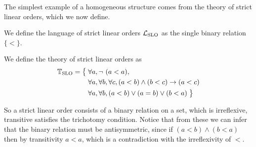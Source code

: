 The simplest example of a homogeneous structure comes from the theory of strict linear orders, which
we now define.

\begin{defn}
  We define the language of strict linear orders $\mathcal{L}_\text{SLO}$ as the single binary relation $\{ < \}$.
\end{defn}

\begin{defn}
  We define the theory of strict linear orders as
  \begin{align*}
    \mathbb{T}_\text{SLO} = \big\{\; & \forall a, \lnot\ (a < a), \\
              & \forall a, \forall b, \forall c, (a < b) \land (b < c) \rightarrow (a < c) \\
              & \forall a, \forall b, (a < b) \lor (a = b) \lor (b < a) \;\big\}
  \end{align*}
\end{defn}

So a strict linear order consists of a binary relation on a set, which is irreflexive, transitive
satisfies the trichotomy condition. Notice that from these we can infer that the binary relation
must be antisymmetric, since if $(a < b) \land (b < a)$ then by transitivity $a < a$, which is
a contradiction with the irreflexivity of $<$.

